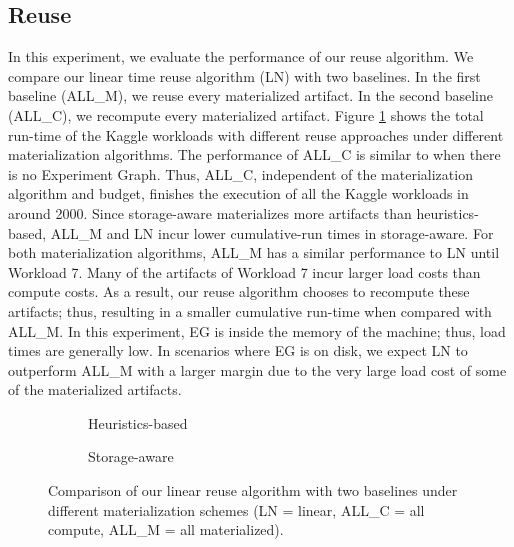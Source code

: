 \subsection{Reuse}
In this experiment, we evaluate the performance of our reuse algorithm.
We compare our linear time reuse algorithm (LN) with two baselines.
In the first baseline (ALL\_M), we reuse every materialized artifact.
In the second baseline (ALL\_C), we recompute every materialized artifact.
Figure \ref{reuse-experiment} shows the total run-time of the Kaggle workloads with different reuse approaches under different materialization algorithms.
The performance of ALL\_C is similar to when there is no Experiment Graph.
Thus, ALL\_C, independent of the materialization algorithm and budget, finishes the execution of all the Kaggle workloads in around 2000.
Since storage-aware materializes more artifacts than heuristics-based, ALL\_M and LN incur lower cumulative-run times in storage-aware.
For both materialization algorithms, ALL\_M has a similar performance to LN until Workload 7.
Many of the artifacts of Workload 7 incur larger load costs than compute costs.
As a result, our reuse algorithm chooses to recompute these artifacts; thus, resulting in a smaller cumulative run-time when compared with ALL\_M.
In this experiment, EG is inside the memory of the machine; thus, load times are generally low.
In scenarios where EG is on disk, we expect LN to outperform ALL\_M with a larger margin due to the very large load cost of some of the materialized artifacts.
\begin{figure}
\begin{subfigure}[b]{0.5\linewidth}
\centering
 \resizebox{\columnwidth}{!}{%
%
}
\caption{Heuristics-based}
\end{subfigure}%
\begin{subfigure}[b]{0.5\linewidth}
\centering
 \resizebox{\columnwidth}{!}{%
%
}

\caption{Storage-aware}
\end{subfigure}
\caption{Comparison of our linear reuse algorithm with two baselines under different materialization schemes (LN = linear, ALL\_C = all compute, ALL\_M = all materialized).}
\label{reuse-experiment}
\end{figure}

